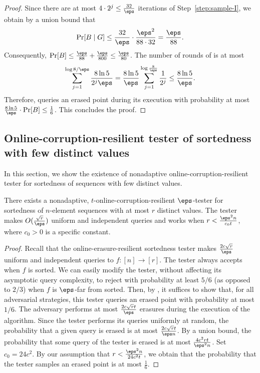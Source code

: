 \documentclass{toc}
\begin{document}
\begin{proof}
Since there are at most $4 \cdot 2^j \leq \frac{32}{\eps}$ iterations of Step~\ref{step:sample-I}, we obtain by a union bound that  
\begin{align*}
    \Pr[B \mid G] \leq \frac{32}{\eps} \cdot \frac{\eps^2}{88\cdot 32} = \frac{\eps}{88}.
\end{align*}
Consequently, $\Pr[B] \leq \frac{\eps}{88} + \frac{\eps}{800} \leq \frac{\eps}{80}$. The number of rounds of  is at most
\begin{align*}
    \sum_{j=1}^{\log 8/\eps} \frac{8\ln 5}{2^j \eps } = \frac{8\ln 5}{\eps} \sum_{j=1}^{\log \frac{8}{\eps}}\frac{1}{2^j} \leq \frac{8 \ln 5}{\eps}. 
\end{align*}
Therefore,  queries an erased point during its execution with probability at most $\frac{8\ln 5}{\eps} \cdot \Pr[B] \leq \frac{1}{6}$. This concludes the proof.  
\end{proof}

%
\subsection{Online-corruption-resilient tester of sortedness with few distinct values}\label{sec:sortedness_corrupt}

In this section, we show  the existence of nonadaptive online-corruption-resilient tester for sortedness of sequences with few distinct values. 

\begin{corollary} \label{cor:sortedness_corrupt}
There exists a nonadaptive, $t$-online-corruption-resilient $\eps$-tester for sortedness of $n$-element sequences with at most $r$ distinct values. The tester makes $O(\frac{\sqrt{r}}{\eps})$ uniform and independent queries and works when $r<\frac{\eps^2 n}{c_0 t}$, where $c_0 > 0$ is a specific constant.
\end{corollary}


\begin{proof} %

Recall that the online-erasure-resilient sortedness tester makes $\frac{2c\sqrt{r}}{\eps}$ uniform and independent queries to $f \colon [n]\to [r]$. The tester always accepts when $f$ is sorted. We can easily modify the tester, without affecting its asymptotic query complexity, to reject with probability at least $5/6$ (as opposed to $2/3$) when $f$ is $\eps$-far from sorted. Then, by , it suffices to show that, for all adversarial strategies, this tester queries an erased point with probability at most $1/6$. The adversary performs at most $\frac{2c\sqrt{r}t}{\eps}$ erasures during the execution of the algorithm. Since the tester performs its queries uniformly at random, the probability that a given query is erased is at most $\frac{2c\sqrt{r}t}{\eps n}$. By a union bound, the probability that some query of the tester is erased is at most $\frac{4c^2 r t}{\eps^2 n}$. Set $c_0=24c^2$. By our assumption that $r < \frac{\eps^2 n}{24c^2 t}$, we obtain that the probability that the tester samples an erased point is at most $\frac{1}{6}$. 
\end{proof}
\end{document}
